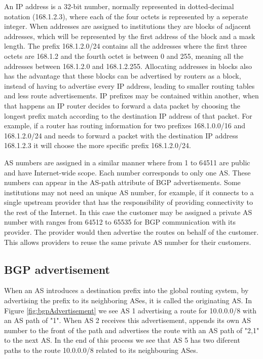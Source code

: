 \documentclass[11pt,a4paper]{scrreprt}
\begin{document}
An IP address is a 32-bit number, normally represented in dotted-decimal notation (168.1.2.3), where each of the four octets is represented by a seperate integer. When addresses are assigned to institutions they are blocks of adjacent addresses, which will be represented by the first address of the block and a mask length. The prefix 168.1.2.0/24 contains all the addresses where the first three octets are 168.1.2 and the fourth octet is between 0 and 255, meaning all the addresses between 168.1.2.0 and 168.1.2.255. Allocating addresses in blocks also has the advantage that these blocks can be advertised by routers as a block, instead of having to advertise every IP address, leading to smaller routing tables and less route advertisements. IP prefixes may be contained within another, when that happens an IP router decides to forward a data packet by choosing the longest prefix match according to the destination IP address of that packet. For example, if a router has routing information for two prefixes 168.1.0.0/16 and 168.1.2.0/24 and needs to forward a packet with the destination IP address 168.1.2.3 it will choose the more specific prefix 168.1.2.0/24. 

AS numbers are assigned in a similar manner where from 1 to 64511 are public and have Internet-wide scope. Each number corresponds to only one AS. These numbers can appear in the AS-path attribute of BGP advertisements. Some institutions may not need an unique AS number, for example, if it connects to a single upstream provider that has the responsibility of providing connectivity to the rest of the Internet. In this case the customer may be assigned a private AS number with ranges from 64512 to 65535 for BGP communication with its provider. The provider would then advertise the routes on behalf of the customer. This allows providers to reuse the same private AS number for their customers.

\subsection{BGP advertisement}

When an AS introduces a destination prefix into the global routing system, by advertising the prefix to its neighboring ASes, it is called the originating AS. In Figure \ref{fig:bgpAdvertisement} we see AS 1 advertising a route for 10.0.0.0/8 with an AS path of "1". When AS 2 receives this advertisement, appends its own AS number to the front of the path and advertises the route with an AS path of "2,1" to the next AS. In the end of this process we see that AS 5 has two diferent paths to the route 10.0.0.0/8 related to its neighbouring ASes.
\end{document}
